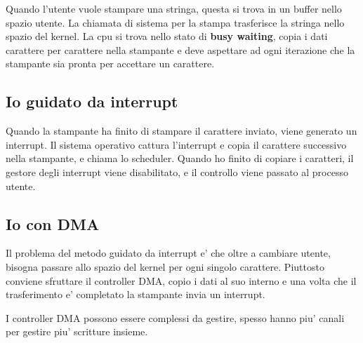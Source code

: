 Quando l'utente vuole stampare una stringa, questa si trova in un buffer nello spazio utente.
La chiamata di sistema per la stampa trasferisce la stringa nello spazio del kernel.
La cpu si trova nello stato di \textbf{busy waiting}, copia i dati carattere per carattere 
nella stampante e deve aspettare ad ogni iterazione che la stampante sia pronta per accettare un carattere.

\subsection{Io guidato da interrupt}
Quando la stampante ha finito di stampare il carattere inviato, viene generato un interrupt.
Il sistema operativo cattura l'interrupt e copia il carattere successivo nella stampante, e chiama lo scheduler.
Quando ho finito di copiare i caratteri, il gestore degli interrupt viene disabilitato, e il controllo viene passato 
al processo utente.

\subsection{Io con DMA}
Il problema del metodo guidato da interrupt e' che oltre a cambiare utente, bisogna passare allo spazio
del kernel per ogni singolo carattere.
Piuttosto conviene sfruttare il controller DMA, copio i dati al suo interno e una volta che 
il trasferimento e' completato la stampante invia un interrupt.

I controller DMA possono essere complessi da gestire, spesso hanno piu' canali per gestire piu' 
scritture insieme.
